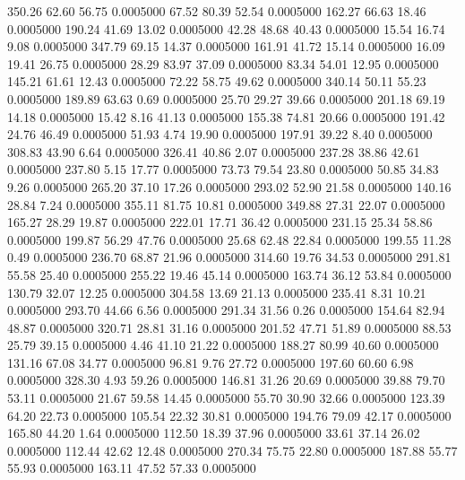  350.26   62.60   56.75   0.0005000
  67.52   80.39   52.54   0.0005000
 162.27   66.63   18.46   0.0005000
 190.24   41.69   13.02   0.0005000
  42.28   48.68   40.43   0.0005000
  15.54   16.74    9.08   0.0005000
 347.79   69.15   14.37   0.0005000
 161.91   41.72   15.14   0.0005000
  16.09   19.41   26.75   0.0005000
  28.29   83.97   37.09   0.0005000
  83.34   54.01   12.95   0.0005000
 145.21   61.61   12.43   0.0005000
  72.22   58.75   49.62   0.0005000
 340.14   50.11   55.23   0.0005000
 189.89   63.63    0.69   0.0005000
  25.70   29.27   39.66   0.0005000
 201.18   69.19   14.18   0.0005000
  15.42    8.16   41.13   0.0005000
 155.38   74.81   20.66   0.0005000
 191.42   24.76   46.49   0.0005000
  51.93    4.74   19.90   0.0005000
 197.91   39.22    8.40   0.0005000
 308.83   43.90    6.64   0.0005000
 326.41   40.86    2.07   0.0005000
 237.28   38.86   42.61   0.0005000
 237.80    5.15   17.77   0.0005000
  73.73   79.54   23.80   0.0005000
  50.85   34.83    9.26   0.0005000
 265.20   37.10   17.26   0.0005000
 293.02   52.90   21.58   0.0005000
 140.16   28.84    7.24   0.0005000
 355.11   81.75   10.81   0.0005000
 349.88   27.31   22.07   0.0005000
 165.27   28.29   19.87   0.0005000
 222.01   17.71   36.42   0.0005000
 231.15   25.34   58.86   0.0005000
 199.87   56.29   47.76   0.0005000
  25.68   62.48   22.84   0.0005000
 199.55   11.28    0.49   0.0005000
 236.70   68.87   21.96   0.0005000
 314.60   19.76   34.53   0.0005000
 291.81   55.58   25.40   0.0005000
 255.22   19.46   45.14   0.0005000
 163.74   36.12   53.84   0.0005000
 130.79   32.07   12.25   0.0005000
 304.58   13.69   21.13   0.0005000
 235.41    8.31   10.21   0.0005000
 293.70   44.66    6.56   0.0005000
 291.34   31.56    0.26   0.0005000
 154.64   82.94   48.87   0.0005000
 320.71   28.81   31.16   0.0005000
 201.52   47.71   51.89   0.0005000
  88.53   25.79   39.15   0.0005000
   4.46   41.10   21.22   0.0005000
 188.27   80.99   40.60   0.0005000
 131.16   67.08   34.77   0.0005000
  96.81    9.76   27.72   0.0005000
 197.60   60.60    6.98   0.0005000
 328.30    4.93   59.26   0.0005000
 146.81   31.26   20.69   0.0005000
  39.88   79.70   53.11   0.0005000
  21.67   59.58   14.45   0.0005000
  55.70   30.90   32.66   0.0005000
 123.39   64.20   22.73   0.0005000
 105.54   22.32   30.81   0.0005000
 194.76   79.09   42.17   0.0005000
 165.80   44.20    1.64   0.0005000
 112.50   18.39   37.96   0.0005000
  33.61   37.14   26.02   0.0005000
 112.44   42.62   12.48   0.0005000
 270.34   75.75   22.80   0.0005000
 187.88   55.77   55.93   0.0005000
 163.11   47.52   57.33   0.0005000
